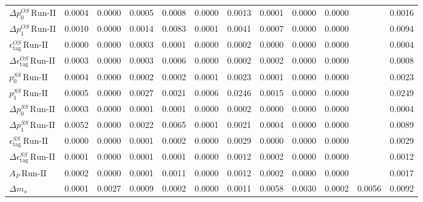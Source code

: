 \begin{tabular}{l  c  c  c  c  c  c  c  c  c  c  | c }
$\Delta p_{0}^{OS} \, \text{Run-II}$ & 0.0004 & 0.0000 & 0.0005 & 0.0008 & 0.0000 & 0.0013 & 0.0001 & 0.0000 & 0.0000 &  & 0.0016 \\ 
$\Delta p_{1}^{OS} \, \text{Run-II}$ & 0.0010 & 0.0000 & 0.0014 & 0.0083 & 0.0001 & 0.0041 & 0.0007 & 0.0000 & 0.0000 &  & 0.0094 \\ 
$\epsilon_{\text{tag}}^{OS} \, \text{Run-II}$ & 0.0000 & 0.0000 & 0.0003 & 0.0001 & 0.0000 & 0.0002 & 0.0000 & 0.0000 & 0.0000 &  & 0.0004 \\ 
$\Delta \epsilon_{\text{tag}}^{OS} \, \text{Run-II}$ & 0.0003 & 0.0000 & 0.0003 & 0.0006 & 0.0000 & 0.0002 & 0.0002 & 0.0000 & 0.0000 &  & 0.0008 \\ 
$p_{0}^{SS} \, \text{Run-II}$ & 0.0004 & 0.0000 & 0.0002 & 0.0002 & 0.0001 & 0.0023 & 0.0001 & 0.0000 & 0.0000 &  & 0.0023 \\ 
$p_{1}^{SS} \, \text{Run-II}$ & 0.0005 & 0.0000 & 0.0027 & 0.0021 & 0.0006 & 0.0246 & 0.0015 & 0.0000 & 0.0000 &  & 0.0249 \\ 
$\Delta p_{0}^{SS} \, \text{Run-II}$ & 0.0003 & 0.0000 & 0.0001 & 0.0001 & 0.0000 & 0.0002 & 0.0000 & 0.0000 & 0.0000 &  & 0.0004 \\ 
$\Delta p_{1}^{SS} \, \text{Run-II}$ & 0.0052 & 0.0000 & 0.0022 & 0.0065 & 0.0001 & 0.0021 & 0.0004 & 0.0000 & 0.0000 &  & 0.0089 \\ 
$\epsilon_{\text{tag}}^{SS} \, \text{Run-II}$ & 0.0000 & 0.0000 & 0.0001 & 0.0002 & 0.0000 & 0.0029 & 0.0000 & 0.0000 & 0.0000 &  & 0.0029 \\ 
$\Delta \epsilon_{\text{tag}}^{SS} \, \text{Run-II}$ & 0.0001 & 0.0000 & 0.0001 & 0.0001 & 0.0000 & 0.0012 & 0.0002 & 0.0000 & 0.0000 &  & 0.0012 \\ 
$A_{P} \, \text{Run-II}$ & 0.0002 & 0.0000 & 0.0001 & 0.0011 & 0.0000 & 0.0012 & 0.0002 & 0.0000 & 0.0000 &  & 0.0017 \\ 
$\Delta m_{s}$ & 0.0001 & 0.0027 & 0.0009 & 0.0002 & 0.0000 & 0.0011 & 0.0058 & 0.0030 & 0.0002 & 0.0056 & 0.0092 \\ 
\hline
\hline
\end{tabular}
